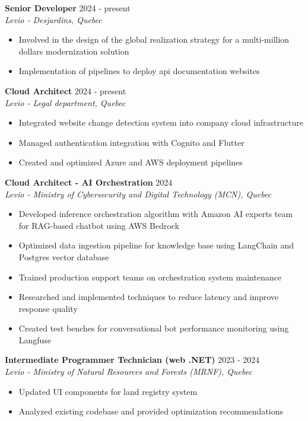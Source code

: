 ﻿\documentclass[11pt,letterpaper]{article}
\begin{document}
\textbf{Senior Developer} \hfill 2024 - present\\
\textit{Levio - Desjardins, Quebec}
\begin{itemize}
\item Involved in the design of the global realization strategy for a multi-million dollars modernization solution
\item Implementation of pipelines to deploy api documentation websites
\end{itemize}

\textbf{Cloud Architect} \hfill 2024 - present\\
\textit{Levio - Legal department, Quebec}
\begin{itemize}
\item Integrated website change detection system into company cloud infrastructure
\item Managed authentication integration with Cognito and Flutter
\item Created and optimized Azure and AWS deployment pipelines
\end{itemize}

\textbf{Cloud Architect - AI Orchestration} \hfill 2024\\
\textit{Levio - Ministry of Cybersecurity and Digital Technology (MCN), Quebec}
\begin{itemize}
\item Developed inference orchestration algorithm with Amazon AI experts team for RAG-based chatbot using AWS Bedrock
\item Optimized data ingestion pipeline for knowledge base using LangChain and Postgres vector database
\item Trained production support teams on orchestration system maintenance
\item Researched and implemented techniques to reduce latency and improve response quality
\item Created test benches for conversational bot performance monitoring using Langfuse
\end{itemize}

\textbf{Intermediate Programmer Technician (web .NET)} \hfill 2023 - 2024\\
\textit{Levio - Ministry of Natural Resources and Forests (MRNF), Quebec}
\begin{itemize}
\item Updated UI components for land registry system
\item Analyzed existing codebase and provided optimization recommendations
\end{itemize}
\end{document}
